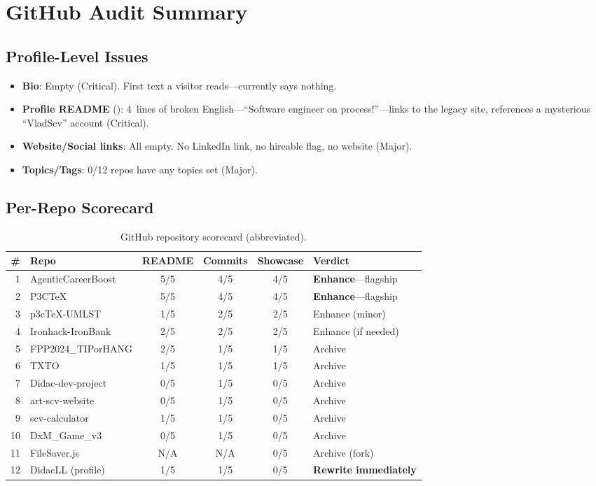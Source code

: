 \documentclass[a4paper,11pt,openany]{report}
\begin{document}
\section{GitHub Audit Summary}

\subsection{Profile-Level Issues}

\begin{itemize}
  \item \textbf{Bio}: Empty (Critical). First text a visitor reads---currently
    says nothing.
  \item \textbf{Profile README} (): 4~lines of broken
    English---``Software engineer on process!''---links to the legacy site,
    references a mysterious ``VladScv'' account (Critical).
  \item \textbf{Website/Social links}: All empty. No LinkedIn link, no
    hireable flag, no website (Major).
  \item \textbf{Topics/Tags}: 0/12 repos have any topics set (Major).
\end{itemize}

\subsection{Per-Repo Scorecard}

\begin{table}[htbp]
\centering
\caption{GitHub repository scorecard (abbreviated).}
\label{tab:repo-scorecard}
\small
\begin{tabularx}{\textwidth}{r l c c c l}
\toprule
\textbf{\#} & \textbf{Repo} & \textbf{README} & \textbf{Commits} & \textbf{Showcase} & \textbf{Verdict} \\
\midrule
1  & AgenticCareerBoost    & 5/5 & 4/5 & 4/5 & \textbf{Enhance}---flagship \\
2  & P3CTeX                & 5/5 & 4/5 & 4/5 & \textbf{Enhance}---flagship \\
3  & p3cTeX-UMLST          & 1/5 & 2/5 & 2/5 & Enhance (minor) \\
4  & Ironhack-IronBank     & 2/5 & 2/5 & 2/5 & Enhance (if needed) \\
5  & FPP2024\_TIPorHANG    & 2/5 & 1/5 & 1/5 & Archive \\
6  & TXTO                  & 1/5 & 1/5 & 1/5 & Archive \\
7  & Didac-dev-project     & 0/5 & 1/5 & 0/5 & Archive \\
8  & art-scv-website       & 0/5 & 1/5 & 0/5 & Archive \\
9  & scv-calculator        & 1/5 & 1/5 & 0/5 & Archive \\
10 & DxM\_Game\_v3         & 0/5 & 1/5 & 0/5 & Archive \\
11 & FileSaver.js          & N/A & N/A & 0/5 & Archive (fork) \\
12 & DidacLL (profile)     & 1/5 & 1/5 & 0/5 & \textbf{Rewrite immediately} \\
\bottomrule
\end{tabularx}
\end{table}
\end{document}
